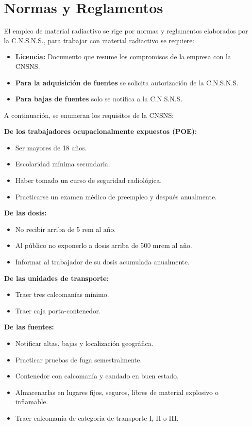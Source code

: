 \chapter{Normas y Reglamentos}

El empleo de material radiactivo se rige por normas y reglamentos elaborados por la C.N.S.N.S., para trabajar con material radiactivo se requiere:

\begin{itemize}
    \item \textbf{Licencia:} Documento que resume los compromisos de la empresa con la CNSNS.
    \item \textbf{Para la adquisición de fuentes} se solicita autorización de la C.N.S.N.S.
    \item \textbf{Para bajas de fuentes} solo se notifica a la C.N.S.N.S.
\end{itemize}

A continuación, se enumeran los requisitos de la CNSNS:

\textbf{De los trabajadores ocupacionalmente expuestos (POE):}
    \begin{itemize}
        \item Ser mayores de 18 años.
        \item Escolaridad mínima secundaria.
        \item Haber tomado un curso de seguridad radiológica.
        \item Practicarse un examen médico de preempleo y después anualmente.
    \end{itemize}
    
\textbf{De las dosis:}
    \begin{itemize}
        \item No recibir arriba de 5 rem al año.
        \item Al público no exponerlo a dosis arriba de 500 mrem al año.
        \item Informar al trabajador de su dosis acumulada anualmente.
    \end{itemize}
    
\textbf{De las unidades de transporte:}
    \begin{itemize}
        \item Traer tres calcomanías mínimo.
        \item Traer caja porta-contenedor.
    \end{itemize}
    
\textbf{De las fuentes:}
    \begin{itemize}
        \item Notificar altas, bajas y localización geográfica.
        \item Practicar pruebas de fuga semestralmente.
        \item Contenedor con calcomanía y candado en buen estado.
        \item Almacenarlas en lugares fijos, seguros, libres de material explosivo o inflamable.
        \item Traer calcomanía de categoría de transporte I, II o III.
    \end{itemize}

